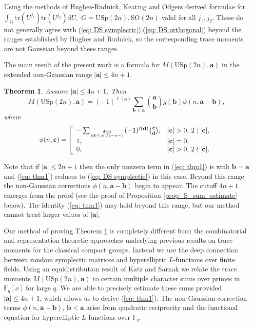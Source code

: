 \documentclass[alphabetic, 
        colorlinks,
        linkcolor=red,  citecolor=blue,
        backref
]{amsart}
\numberwithin{equation}{section}
\newtheorem{thm}{Theorem}
\theoremstyle{definition}
\newcommand{\USp}{{\mathrm{USp}}}
\newcommand{\SO}{{\mathrm{SO}}}
\newcommand{\tr}{{\mathrm{tr}}}
\newcommand{\F}{\mathbb{F}}
\begin{document}
Using the methods of Hughes-Rudnick, Keating and Odgers \cite[Lemma 2]{KeOd08} derived formulae for $\int_G\tr(U^{j_1})\tr(U^{j_2})\mathrm dU,$ $G=\USp(2n),\SO(2n)$ valid for all $j_1,j_2$. 
These do not generally agree with (\ref{eq: DS symplectic}),(\ref{eq: DS orthogonal}) beyond the ranges established by Hughes and Rudnick, so the corresponding trace moments are not Gaussian beyond these ranges.

The main result of the present work is a formula for $M(\USp(2n),\mathbf a)$ in the extended non-Gaussian range $|\mathbf a|\le 4n+1$.


    






\begin{thm}\label{thm: main} Assume $|\mathbf a|\le 4n+1$. Then
\begin{equation}\label{eq: thm1}M(\USp(2n),\mathbf a)=(-1)^{\ell(\mathbf a)}\sum_{\mathbf b\le\mathbf a}{\mathbf a\choose\mathbf b}g(\mathbf b)\phi(n,\mathbf a-\mathbf b),\end{equation}
where 
\begin{equation}\label{eq: def phi}\phi(n,\mathbf c)=\left[\begin{array}{ll}
-\sum_{\mathbf d\le\mathbf c\atop{|\mathbf d|\le{|\mathbf c|}/2-n-1}}(-1)^{\ell(\mathbf d)}{\mathbf c\choose\mathbf d},&|\mathbf c|>0,\,2\mid |\mathbf c|,\\1,&|\mathbf c|=0, \\0,&|\mathbf c|>0,\,2\nmid|\mathbf c|. \end{array}\right.\end{equation}
\end{thm}

Note that if $|\mathbf a|\le 2n+1$ then the only nonzero term in
(\ref{eq: thm1}) is with $\mathbf b=\mathbf a$ and (\ref{eq: thm1}) reduces to (\ref{eq: DS symplectic}) in this case. Beyond this range the non-Gaussian corrections $\phi(n,\mathbf a-\mathbf b)$ begin to appear. The cutoff $4n+1$ emerges from the proof (see the proof of Proposition \ref{prop_S_sum_estimate} below). The identity (\ref{eq: thm1}) may hold beyond this range, but our method cannot treat larger values of $|\mathbf a|$.

Our method of proving Theorem \ref{thm: main} is completely different from the combinatorial and representation-theoretic approaches underlying previous results on trace moments for the classical compact groups. Instead we use the deep connection between random symplectic matrices and hyperelliptic $L$-functions over finite fields. Using an equidistribution result of Katz and Sarnak we relate the trace moments $M(\USp(2n),\mathbf a)$ to certain multiple character sums over primes in $\F_q[x]$ for large $q$. We are able to precisely estimate these sums provided $|\mathbf a|\le 4n+1$, which allows us to derive (\ref{eq: thm1}). The non-Gaussian correction terms $\phi(n,\mathbf a-\mathbf b),\,\mathbf b<\mathbf a$ arise from quadratic reciprocity and the functional equation for hyperelliptic $L$-functions over $\F_q$.
\end{document}
